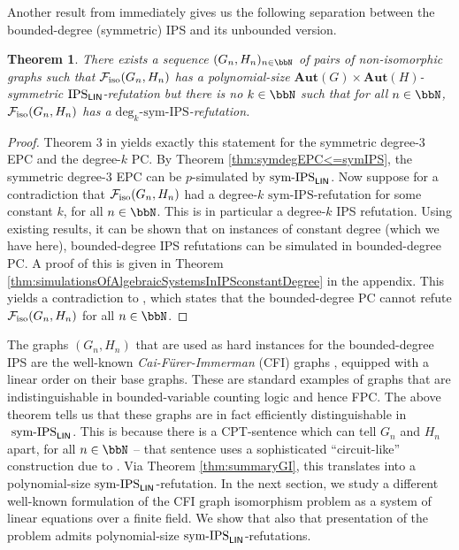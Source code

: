 \documentclass[10pt,a4paper]{article}
\newtheorem{theorem}{Theorem}
\newcommand{\Aut}{\mathbf{Aut}}
\newcommand{\Ff}{{\cal F}}
\newcommand{\sIPS}{\mathrm{sym\text{-}IPS}}
\newcommand{\Piso}{\Ff_{\text{iso}}}
\newcommand{\IPSlin}{\text{\upshape IPS}_{\mathsf{LIN}}}
\newcommand{\symIPSlin}{\text{ \upshape sym-IPS}_{\mathsf{LIN}}}
\begin{document}
Another result from \cite{Pago} immediately gives us the following separation between the bounded-degree (symmetric) IPS and its unbounded version.
\begin{theorem}
	\label{thm:separationOfSymBoundedDegree}
	There exists a sequence $(G_n,H_n)_{n \in \bbN}$ of pairs of non-isomorphic graphs such that $\Piso(G_n,H_n)$ has a polynomial-size $\Aut(G) \times \Aut(H)$-symmetric $\IPSlin$-refutation but there is no $k \in \bbN$ such that for all $n \in \bbN$, $\Piso(G_n,H_n)$ has a $\mathrm{deg}_k\text{-}\sIPS$-refutation.
\end{theorem}	
\begin{proof}
	Theorem 3 in \cite{Pago} yields exactly this statement for the symmetric degree-$3$ EPC and the degree-$k$ PC. 
	By Theorem \ref{thm:symdegEPC<=symIPS}, the symmetric degree-$3$ EPC can be $p$-simulated by$\symIPSlin{}$. Now suppose for a contradiction that $\Piso(G_n,H_n)$ had a degree-$k$ $\sIPS$-refutation for some constant $k$, for all $n \in \bbN$. This is in particular a degree-$k$ IPS refutation. 
	Using existing results, it can be shown that on instances of constant degree (which we have here), bounded-degree IPS refutations can be simulated in bounded-degree PC. A proof of this is given in Theorem \ref{thm:simulationsOfAlgebraicSystemsInIPSconstantDegree} in the appendix. This yields a contradiction to \cite[Theorem 3]{Pago}, which states that the bounded-degree PC cannot refute $\Piso(G_n,H_n)$ for all $n \in \bbN$.
\end{proof}	
The graphs $(G_n,H_n)$ that are used as hard instances for the bounded-degree IPS are the well-known \emph{Cai-Fürer-Immerman} (CFI) graphs \cite{GI, caifurimm92}, equipped with a linear order on their base graphs. These are standard examples of graphs that are indistinguishable in bounded-variable counting logic and hence FPC.
The above theorem tells us that these graphs are in fact efficiently distinguishable in$\symIPSlin$. This is because there is a CPT-sentence which can tell $G_n$ and $H_n$ apart, for all $n \in \bbN$ -- that sentence uses a sophisticated ``circuit-like'' construction due to \cite{dawar2008}. Via Theorem \ref{thm:summaryGI}, this translates into a polynomial-size$\symIPSlin{}$-refutation. In the next section, we study a different well-known formulation of the CFI graph isomorphism problem as a system of linear equations over a finite field. We show that also that presentation of the problem admits polynomial-size$\symIPSlin{}$-refutations.

\end{document}
